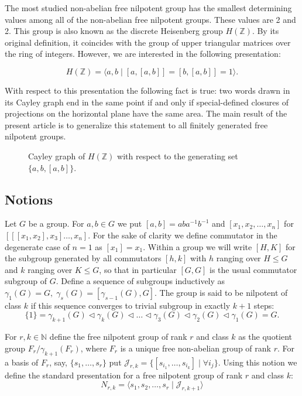 \documentclass[11pt]{amsart}
\theoremstyle{plain}
\theoremstyle{definition}
\numberwithin{equation}{section}
\newcommand{\JJ}{\mathcal{J}_{r,k}}
\newcommand{\ZZ}{\mathbb{Z}}
\begin{document}
The most studied non-abelian free nilpotent group has the smallest determining values among all of the non-abelian free nilpotent groups. These values are 2 and 2. This group is also known as the discrete Heisenberg group $H(\ZZ)$. By its original definition, it coincides with the group of upper triangular matrices over the ring of integers. However, we are interested in the following presentation:

$$H(\ZZ) = \langle a,b \;|\; [a,[a,b]]=[b,[a,b]] = 1\rangle. $$

With respect to this presentation the following fact is true: two words drawn in its Cayley graph end in the same point if and only if special-defined closures of projections on the horizontal plane have the same area. The main result of the present article is to generalize this statement to all finitely generated free nilpotent groups.



  \begin{figure}[h]
\caption{Cayley graph of $H(\ZZ)$ with respect to the generating set $\{a,b,[a,b]\}$.}
\label{CayN2}
\end{figure}

\subsection{Notions}

Let $G$ be a group. For $a,b\in G$ we put $[a,b] = aba^{-1}b^{-1}$ and $[x_1,x_2,\ldots,x_n]$ for $[[[x_1,x_2],x_3]\ldots,x_n]$. For the sake of clarity we define commutator in the degenerate case of $n=1$ as $[x_1] = x_1$. Within a group we will write $[H, K]$ for the subgroup generated by all commutators $[h, k]$ with $h$ ranging over $H \leq G$ and $k$ ranging over $K \leq G$, so that in particular $[G, G]$ is the usual commutator subgroup of $G$. Define a sequence of subgroups inductively as $\gamma_1(G) = G,\; \gamma_s(G) = [\gamma_{s-1}(G),G]$. The group is said to be nilpotent of class $k$ if this sequence converges to trivial subgroup in exactly $k+1$ steps:
$$\{1\} = \gamma_{k+1}(G)\vartriangleleft \gamma_k(G) \vartriangleleft\ldots\vartriangleleft \gamma_3(G)\vartriangleleft \gamma_2(G) \vartriangleleft \gamma_1(G) = G.$$

For $r,k \in \mathbb{N}$ define the free nilpotent group of rank $r$ and class $k$ as the quotient group $F_r/\gamma_{k+1}(F_r)$, where $F_r$ is a unique free non-abelian group of rank $r$. For a basis of $F_r$, say, $\{s_1,\ldots, s_r\}$ put $\JJ =\{ [s_{i_1},\ldots,s_{i_k}] \; | \; \forall i_j\}$. Using this notion we define the standard presentation for a free nilpotent group of rank $r$ and class $k$:
$$N_{r,k} = \langle s_1,s_2,\ldots, s_r \; | \; \mathcal{J}_{r,k+1} \rangle$$
\end{document}
